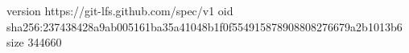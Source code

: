 version https://git-lfs.github.com/spec/v1
oid sha256:237438428a9ab005161ba35a41048b1f0f554915878908808276679a2b1013b6
size 344660
